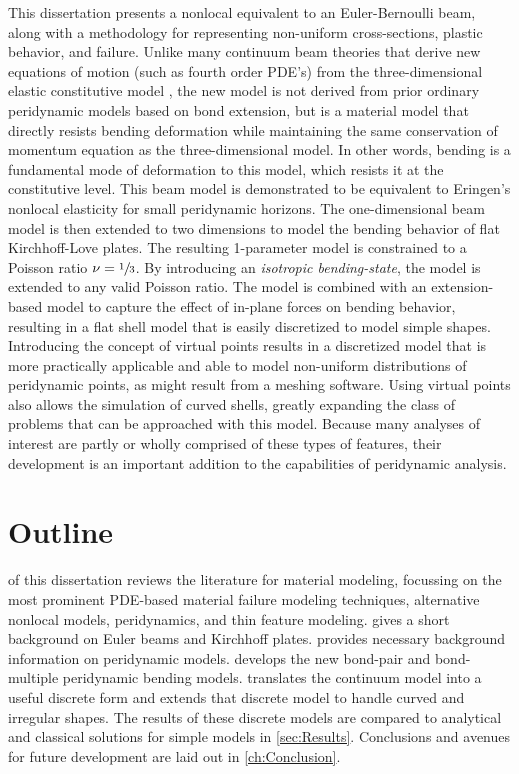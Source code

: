 This dissertation presents a nonlocal equivalent to an Euler-Bernoulli beam, along with a methodology for representing non-uniform cross-sections, plastic behavior, and failure.
Unlike many continuum beam theories that derive new equations of motion (such as fourth order PDE's) from the three-dimensional elastic constitutive model , the new model is not derived from prior ordinary peridynamic models based on bond extension, but is a material model that directly resists bending deformation while maintaining the same conservation of momentum equation as the three-dimensional model.
In other words, bending is a fundamental mode of deformation to this model, which resists it at the constitutive level.
This beam model is demonstrated to be equivalent to Eringen's nonlocal elasticity for small peridynamic horizons.
The one-dimensional beam model is then extended to two dimensions to model the bending behavior of flat Kirchhoff-Love plates.
The resulting 1-parameter model is constrained to a Poisson ratio \(\nu=\sfrac{1}{3}\).  
By introducing an \emph{isotropic bending-state}, the model is extended to any valid Poisson ratio.  
The model is combined with an extension-based model to capture the effect of in-plane forces on bending behavior, resulting in a flat shell model that is easily discretized to model simple shapes.
Introducing the concept of virtual points results in a discretized model that is more practically applicable and able to model non-uniform distributions of peridynamic points, as might result from a meshing software.
Using virtual points also allows the simulation of curved shells, greatly expanding the class of problems that can be approached with this model.
Because many analyses of interest are partly or wholly comprised of these types of features, their development is an important addition to the capabilities of peridynamic analysis.

\section{Outline}

 of this dissertation reviews the literature for material modeling, focussing on the most prominent PDE-based material failure modeling techniques, alternative nonlocal models, peridynamics, and thin feature modeling.  gives a short background on Euler beams and Kirchhoff plates.   provides necessary background information on peridynamic models.   develops the new bond-pair and bond-multiple peridynamic bending models.  translates the continuum model into a useful discrete form and extends that discrete model to handle curved and irregular shapes. The results of these discrete models are compared to analytical and classical solutions for simple models in \cref{sec:Results}. Conclusions and avenues for future development are laid out in \cref{ch:Conclusion}.
